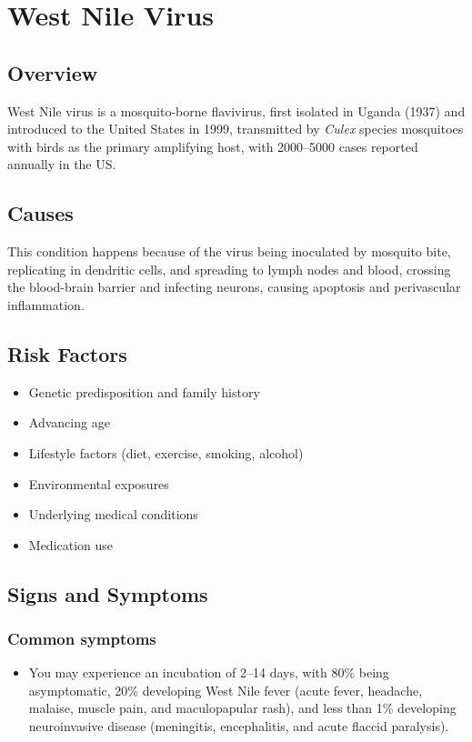 \chapter{West Nile Virus}
\label{sec:West Nile Virus}

\section{Overview}
West Nile virus is a mosquito-borne flavivirus, first isolated in Uganda (1937) and introduced to the United States in 1999, transmitted by \textit{Culex} species mosquitoes with birds as the primary amplifying host, with 2000--5000 cases reported annually in the US.
\section{Causes}
This condition happens because of the virus being inoculated by mosquito bite, replicating in dendritic cells, and spreading to lymph nodes and blood, crossing the blood-brain barrier and infecting neurons, causing apoptosis and perivascular inflammation.     
\section{Risk Factors}

\begin{itemize}[noitemsep]
  \item Genetic predisposition and family history
  \item Advancing age
  \item Lifestyle factors (diet, exercise, smoking, alcohol)
  \item Environmental exposures
  \item Underlying medical conditions
  \item Medication use
\end{itemize}
\section{Signs and Symptoms}

\subsection{Common symptoms}
\begin{itemize}[noitemsep]
  \item You may experience an incubation of 2--14 days, with 80\% being asymptomatic, 20\% developing West Nile fever (acute fever, headache, malaise, muscle pain, and maculopapular rash), and less than 1\% developing neuroinvasive disease (meningitis, encephalitis, and acute flaccid paralysis). 
  \end{itemize}

